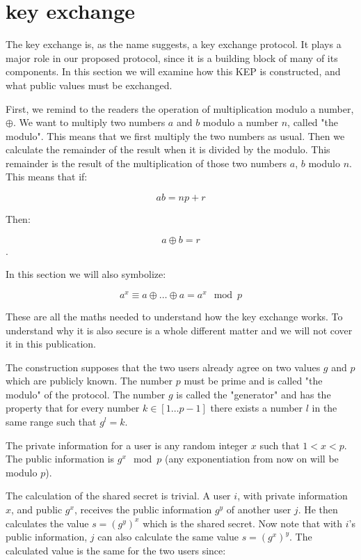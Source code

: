 \section{\dhname key exchange}

The \dhname key exchange is, as the name suggests, a key exchange protocol.
It plays a major role in our proposed protocol, since it is a building block of many of its components.
In this section we will examine how this KEP is constructed, and what public values must be exchanged.

First, we remind to the readers the operation of multiplication modulo a number, $\oplus$.
We want to multiply two numbers $a$ and $b$ modulo a number $n$, called "the modulo".
This means that we first multiply the two numbers as usual.
Then we calculate the remainder of the result when it is divided by the modulo.
This remainder is the result of the multiplication of those two numbers $a$, $b$ modulo $n$.
This means that if:

\[
  ab = np + r
\]

Then:

\[
  a \oplus b  = r
\]
.

In this section we will also symbolize:

\[
  a^x \equiv a \oplus \dots \oplus a = a^x \mod p
\]

These are all the maths needed to understand how the \dhname key exchange works.
To understand why it is also secure is a whole different matter and we will not cover it in this publication.

The \dhname construction supposes that the two users already agree on two values $g$ and $p$ which are publicly known.
The number $p$ must be prime and is called "the modulo" of the protocol.
The number $g$ is called the "generator" and has the property that for every number $k \in [1 \dots p-1]$ there exists a number $l$ in the same range such that $g^l = k$.

The private information for a user is any random integer $x$ such that $ 1 < x < p$.
The public information is $g^x \mod p$ (any exponentiation from now on will be modulo $p$).

The calculation of the shared secret is trivial.
A user $i$, with private information $x$, and public $g^x$, receives the public information $g^y$ of another user $j$.
He then calculates the value $s = (g^y)^x$ which is the shared secret.
Now note that with $i$'s public information, $j$ can also calculate the same value $s = (g^x)^y$.
The calculated value is the same for the two users since:

